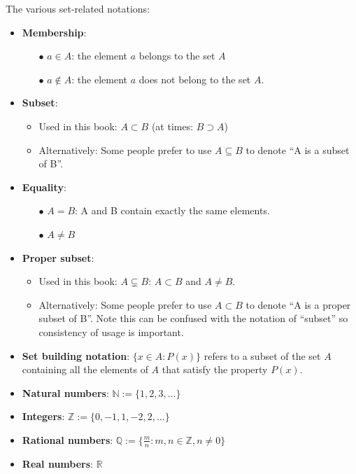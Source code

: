 \documentclass[12pt, letterpaper, oneside]{book}
\begin{document}
The various set-related notations:
\begin{itemize}
  \item \textbf{Membership}:
        \begin{itemize}
          \item[$\bullet$] $a \in A$: the element $a$ belongs to the set $A$
          \item[$\bullet$] $a \notin A$: the element $a$ does not belong to the set
                $A$.
        \end{itemize}
  \item \textbf{Subset}:
        \begin{itemize}
          \item Used in this book: $A \subset B$ (at times: $B \supset A$)
          \item Alternatively: Some people prefer to use $A \subseteq B$ to denote
                ``A is a subset of B''.
        \end{itemize}
  \item \textbf{Equality}:
        \begin{itemize}
          \item[$\bullet$] $A = B$: A and B contain exactly the same elements.
          \item[$\bullet$] $A \neq B$
        \end{itemize}
  \item \textbf{Proper subset}:
        \begin{itemize}
          \item Used in this book: $A \subsetneq B$: $A \subset B$ and $A \neq B$.
          \item Alternatively: Some people prefer to use $A \subset B$ to denote
                ``A is a proper subset of B''. Note this can be confused with the
                notation of ``subset'' so consistency of usage is important.
        \end{itemize}
  \item \textbf{Set building notation}: $\{x \in A: P(x)\}$ refers to a subset
        of the set $A$ containing all the elements of $A$ that satisfy the property
        $P(x)$.
  \item \textbf{Natural numbers}: $\mathbb{N} := \{1, 2, 3, \ldots \}$
  \item \textbf{Integers}: $\mathbb{Z} := \{0, -1, 1, -2, 2, \ldots \}$
  \item \textbf{Rational numbers}: $\mathbb{Q} := \{\frac{m}{n}: m,n \in
          \mathbb{Z}, n \neq 0 \}$
  \item \textbf{Real numbers}: $\mathbb{R}$

\end{itemize}
\end{document}
